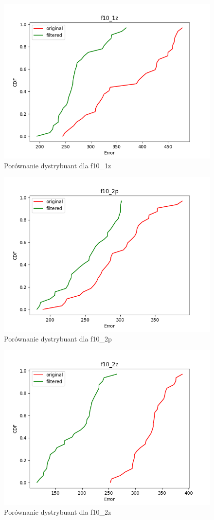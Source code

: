 \documentclass{classrep}
\begin{document}
{\begin{figure}[!htbp]
            \centering
            \includegraphics[width=\textwidth, width=90mm]{comparison_f10_1z.png}
            \caption{Porównanie dystrybuant dla f10\_1z}
            \label{comparison_f10_1z}
    \end{figure}

\begin{figure}[!htbp]
            \centering
            \includegraphics[width=\textwidth, width=90mm]{comparison_f10_2p.png}
            \caption{Porównanie dystrybuant dla f10\_2p}
            \label{comparison_f10_2p}
    \end{figure}

\begin{figure}[!htbp]
            \centering
            \includegraphics[width=\textwidth, width=90mm]{comparison_f10_2z.png}
            \caption{Porównanie dystrybuant dla f10\_2z}
            \label{comparison_f10_2z}
    \end{figure}

}
\end{document}
